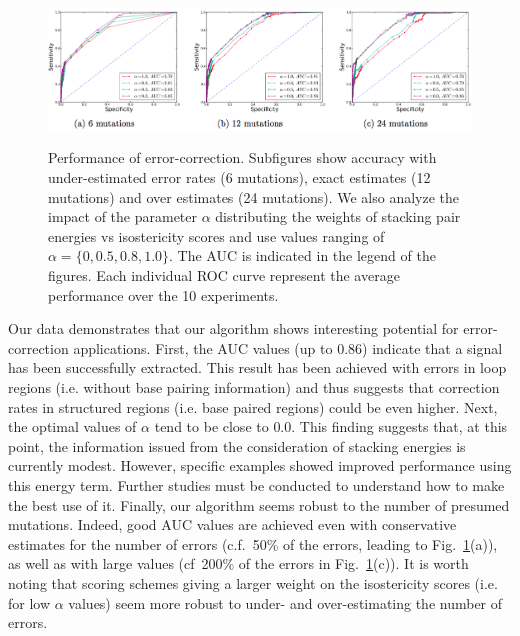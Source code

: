 \begin{figure}
\centering
	\includegraphics[width=\textwidth]{Figure5-subfigs_perform}\\

\caption{Performance of error-correction. Subfigures show accuracy with under-estimated error rates (6 mutations), exact estimates (12 mutations) and over estimates 
(24 mutations). We also analyze the impact of the parameter $\alpha$ distributing the weights of stacking pair energies vs isostericity scores and use values 
ranging of $\alpha=\{0,0.5,0.8,1.0\}$. The AUC is indicated in the legend of the figures. Each individual ROC curve represent the average performance over the 10 experiments.}
\label{fig:ROCall}\SpaceCheating
\end{figure}

Our data demonstrates that our algorithm shows interesting potential for error-correction applications. First, the AUC values (up to $0.86$) indicate that a
signal has been successfully extracted. This result has been achieved with errors in loop regions (i.e. without base pairing information) and thus suggests
that correction rates in structured regions (i.e. base paired regions) could be even higher. Next, the optimal values of $\alpha$ tend to be close to $0.0$. This 
finding suggests that, at this point, the information issued from the consideration of stacking energies is currently modest. However, specific examples showed improved performance
using this energy term. Further studies must be conducted to understand how to make the best use of it. Finally, our algorithm seems robust to the number of
presumed mutations. Indeed, good AUC values are achieved even with conservative estimates for the number of errors (c.f.~50\% of the errors, leading to 
Fig.~\ref{fig:ROCall}(a)), as well as with large  values (cf~200\% of the errors  in Fig.~\ref{fig:ROCall}(c)). It is worth noting that scoring schemes giving a larger weight on
the isostericity scores (i.e. for low $\alpha$ values) seem more robust to under- and over-estimating the number of errors.

